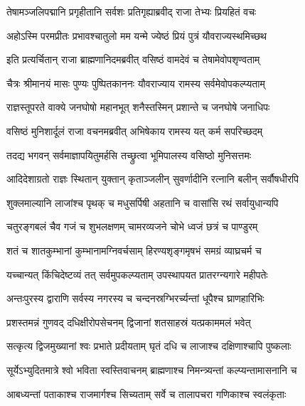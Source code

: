 
\twolineshloka
{तेषामञ्जलिपद्मानि प्रगृहीतानि सर्वशः}
{प्रतिगृह्याब्रवीद् राजा तेभ्यः प्रियहितं वचः} %

\twolineshloka
{अहोऽस्मि परमप्रीतः प्रभावश्चातुलो मम}
{यन्मे ज्येष्ठं प्रियं पुत्रं यौवराज्यस्थमिच्छथ} %

\twolineshloka
{इति प्रत्यर्चितान् राजा ब्राह्मणानिदमब्रवीत्}
{वसिष्ठं वामदेवं च तेषामेवोपशृण्वताम्} %

\twolineshloka
{चैत्रः श्रीमानयं मासः पुण्यः पुष्पितकाननः}
{यौवराज्याय रामस्य सर्वमेवोपकल्प्यताम्} %

\twolineshloka
{राज्ञस्तूपरते वाक्ये जनघोषो महानभूत्}
{शनैस्तस्मिन् प्रशान्ते च जनघोषे जनाधिपः} %

\twolineshloka
{वसिष्ठं मुनिशार्दूलं राजा वचनमब्रवीत्}
{अभिषेकाय रामस्य यत् कर्म सपरिच्छदम्} %

\twolineshloka
{तदद्य भगवन् सर्वमाज्ञापयितुमर्हसि}
{तच्छ्रुत्वा भूमिपालस्य वसिष्ठो मुनिसत्तमः} %

\twolineshloka
{आदिदेशाग्रतो राज्ञः स्थितान् युक्तान् कृताञ्जलीन्}
{सुवर्णादीनि रत्नानि बलीन् सर्वौषधीरपि} %

\twolineshloka
{शुक्लमाल्यानि लाजांश्च पृथक् च मधुसर्पिषी}
{अहतानि च वासांसि रथं सर्वायुधान्यपि} %

\twolineshloka
{चतुरङ्गबलं चैव गजं च शुभलक्षणम्}
{चामरव्यजने चोभे ध्वजं छत्रं च पाण्डुरम्} %

\twolineshloka
{शतं च शातकुम्भानां कुम्भानामग्निवर्चसाम्}
{हिरण्यशृङ्गमृषभं समग्रं व्याघ्रचर्म च} %

\twolineshloka
{यच्चान्यत् किंचिदेष्टव्यं तत् सर्वमुपकल्प्यताम्}
{उपस्थापयत प्रातरग्न्यगारे महीपतेः} %

\twolineshloka
{अन्तःपुरस्य द्वाराणि सर्वस्य नगरस्य च}
{चन्दनस्रग्भिरर्च्यन्तां धूपैश्च घ्राणहारिभिः} %

\twolineshloka
{प्रशस्तमन्नं गुणवद् दधिक्षीरोपसेचनम्}
{द्विजानां शतसाहस्रं यत्प्रकाममलं भवेत्} %

\twolineshloka
{सत्कृत्य द्विजमुख्यानां श्वः प्रभाते प्रदीयताम्}
{घृतं दधि च लाजाश्च दक्षिणाश्चापि पुष्कलाः} %

\twolineshloka
{सूर्येऽभ्युदितमात्रे श्वो भविता स्वस्तिवाचनम्}
{ब्राह्मणाश्च निमन्त्र्यन्तां कल्प्यन्तामासनानि च} %

\twolineshloka
{आबध्यन्तां पताकाश्च राजमार्गश्च सिच्यताम्}
{सर्वे च तालापचरा गणिकाश्च स्वलंकृताः} %

